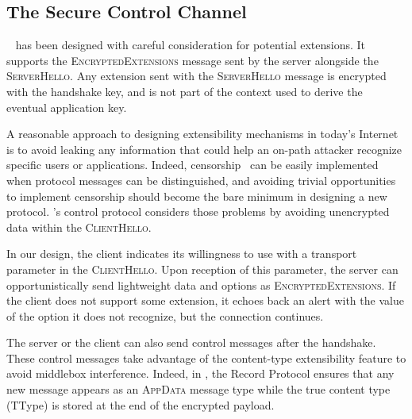 
\subsection{The Secure Control Channel}\label{sec:extending}

~\cite{rfc8446} has been designed with careful consideration for
potential extensions. It supports the \textsc{EncryptedExtensions} message sent
by the server alongside the \textsc{ServerHello}. Any extension sent with the
\textsc{ServerHello} message is encrypted with the handshake key, and is not
part of the context used to derive the eventual application key.

A reasonable approach to designing extensibility mechanisms in today's Internet
is to avoid leaking any information that could help an on-path attacker
recognize specific users or applications. Indeed, censorship~\cite{Morshed2017a,
  Gosain2017a,Chai2019a} can be easily implemented when protocol messages can be
distinguished, and avoiding trivial opportunities to implement censorship should
become the bare minimum in designing a new protocol. \tcpls's control protocol
considers those problems by avoiding unencrypted data within the
\textsc{ClientHello}.

In our design, the client indicates its willingness to use \tcpls with a
transport parameter in the \textsc{ClientHello}. Upon reception of this
parameter, the server can opportunistically send lightweight \tcpls data and
\tcp options as \textsc{EncryptedExtensions}. If the client does not support
some extension, it echoes back an alert with the value of the option it does not
recognize, but the connection continues.

The server or the client can also send \tcpls control messages after the
handshake. These control messages take advantage of the  content-type
extensibility feature to avoid middlebox interference. Indeed, in , the
Record Protocol ensures that any new message appears as an \textsc{AppData}
message type while the true content type (TType) is stored at the end of the
encrypted payload.

